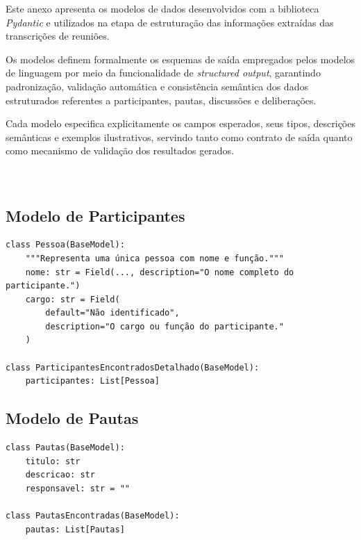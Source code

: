 \label{an:modelos-pydantic}

Este anexo apresenta os modelos de dados desenvolvidos com a biblioteca \textit{Pydantic} e utilizados na etapa de estruturação das informações extraídas das transcrições de reuniões.

Os modelos definem formalmente os esquemas de saída empregados pelos modelos de linguagem por meio da funcionalidade de \textit{structured output}, garantindo padronização, validação automática e consistência semântica dos dados estruturados referentes a participantes, pautas, discussões e deliberações.

Cada modelo especifica explicitamente os campos esperados, seus tipos, descrições semânticas e exemplos ilustrativos, servindo tanto como contrato de saída quanto como mecanismo de validação dos resultados gerados.
\\
\\
\\

\subsection*{Modelo de Participantes}

\begin{lstlisting}[caption={Modelo Pydantic para representação de participantes}]
class Pessoa(BaseModel):
    """Representa uma única pessoa com nome e função."""
    nome: str = Field(..., description="O nome completo do participante.")
    cargo: str = Field(
        default="Não identificado",
        description="O cargo ou função do participante."
    )

class ParticipantesEncontradosDetalhado(BaseModel):
    participantes: List[Pessoa]
\end{lstlisting}

\pagebreak

\subsection*{Modelo de Pautas}

\begin{lstlisting}[caption={Modelo Pydantic para estruturação das pautas}]
class Pautas(BaseModel):
    titulo: str
    descricao: str
    responsavel: str = ""

class PautasEncontradas(BaseModel):
    pautas: List[Pautas]
\end{lstlisting}


